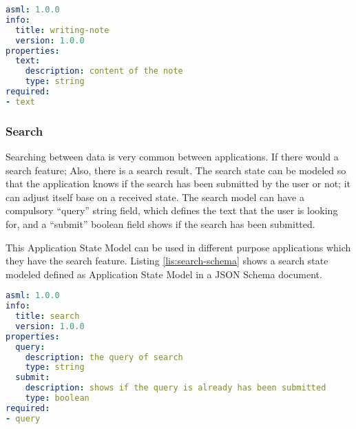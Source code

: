 \lstset{
  label=lis:note-schema, caption=Note Writing example model as JSON Schema in YAML.
}
\begin{lstlisting}[language=yaml]
asml: 1.0.0
info:
  title: writing-note
  version: 1.0.0
properties:
  text:
    description: content of the note
    type: string
required:
- text

\end{lstlisting}
\subsubsection{Search}
Searching between data is very common between applications. If there would a search feature; Also, there is a search result. The search state can be modeled so that the application knows if the search has been submitted by the user or not; it can adjust itself base on a received state. The search model can have a compulsory “query” string field, which defines the text that the user is looking for, and a “submit” boolean field shows if the search has been submitted.

This Application State Model can be used in different purpose applications which they have the search feature. Listing \ref{lis:search-schema} shows a search state modeled defined as Application State Model in a JSON Schema document.

\lstset{
  label=lis:search-schema, caption=Search model as JSON Schema in YAML., 
  frame=single, captionpos=b,
  xleftmargin=.1\textwidth, xrightmargin=.1\textwidth,
  breaklines=true
}
\begin{lstlisting}[language=yaml]
asml: 1.0.0
info:
  title: search
  version: 1.0.0
properties:
  query:
    description: the query of search
    type: string
  submit:
    description: shows if the query is already has been submitted
    type: boolean
required:
- query
\end{lstlisting}
